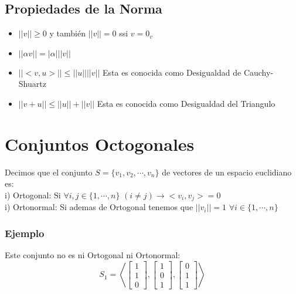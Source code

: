 \documentclass[12pt]{report}                                %
\begin{document}
        \subsection{Propiedades de la Norma}
        \begin{itemize}
            \item $||v|| \geq 0$ y también $||v|| = 0$ ssi $v = 0_v$   
            \item $|| \alpha v||  = |\alpha| ||v|| $
            \item $||<v, u>||  \leq ||u|| ||v|| $ Esta es conocida como Desigualdad de Cauchy-Shuartz
            \item $||v + u||  \leq ||u|| + ||v|| $ Esta es conocida como Desigualdad del Triangulo
        \end{itemize}



    \clearpage
    \section{Conjuntos Octogonales}

        Decimos que el conjunto $S = \{v_1, v_2, \cdots, v_n \}$ de vectores de un espacio euclidiano es: \\

        i) Ortogonal: Si $\forall i, j \in \{1, \cdots, n \}$ $(i\neq j) \to <v_i, v_j> = 0$ \\

        i) Ortonormal: Si ademas de Ortogonal tenemos que $||v_i|| = 1$ $\forall i\in \{1, \cdots, n \}$

        \subsubsection{Ejemplo}

        Este conjunto no es ni Ortogonal ni Ortonormal:
        \begin{equation*}
            S_1 = \left< \begin{bmatrix} 1\\1\\0\end{bmatrix} , \begin{bmatrix} 1\\0\\1\end{bmatrix}, \begin{bmatrix} 0\\1\\1\end{bmatrix} \right> 
        \end{equation*}
\end{document}
